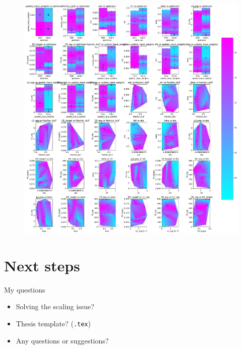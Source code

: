 \documentclass[t]{beamer}
\begin{document}
\begin{frame}{}

	\begin{figure}[!ht]
		\includegraphics[clip, trim=0cm 0cm 0cm 0cm, width=0.6\linewidth]{all.pdf}  %
	\end{figure}

\end{frame}


\section{Next steps}
\begin{frame}{My questions}
\begin{itemize}[label=--]
\item Solving the scaling issue?
\item Thesis template? (\texttt{.tex})
\item Any questions or suggestions?
\end{itemize}


\end{frame}
\end{document}
